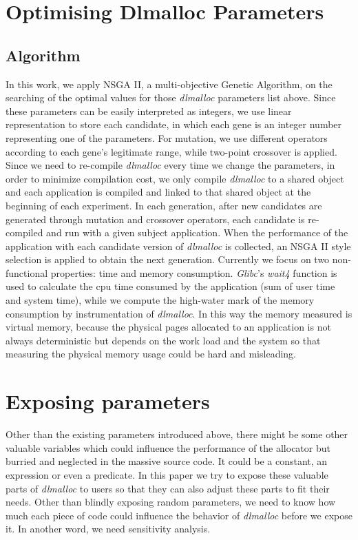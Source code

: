 \section{Optimising Dlmalloc Parameters}

\subsection{Algorithm}
In this work, we apply NSGA II\cite{996017}, a multi-objective Genetic Algorithm, on the searching of the optimal values for those \emph{dlmalloc} parameters list above.
Since these parameters can be easily interpreted as integers, we use linear representation to store each candidate, in which each gene is an integer number representing one of the parameters. For mutation, we use different operators according to each gene's legitimate range, while two-point crossover is applied.
Since we need to re-compile \emph{dlmalloc} every time we change the parameters, in order to minimize compilation cost, we only compile \emph{dlmalloc} to a shared object and each application is compiled and linked to that shared object at the beginning of each experiment. In each generation, after new candidates are generated through mutation and crossover operators, each candidate is re-compiled and run with a given subject application. When the performance of the application with each candidate version of \emph{dlmalloc} is collected, an NSGA II style selection is applied to obtain the next generation.
Currently we focus on two non-functional properties: time and memory consumption. \emph{Glibc}'s \emph{wait4} function is used to calculate the cpu time consumed by the application (sum of user time and system time), while we compute the high-water mark of the memory consumption by instrumentation of \emph{dlmalloc}. In this way the memory measured is virtual memory, because the physical pages allocated to an application is not always deterministic but depends on the work load and the system so that measuring the physical memory usage could be hard and misleading.


\section{Exposing parameters}
Other than the existing parameters introduced above, there might be some other valuable variables which could influence the performance of the allocator but burried and neglected in the massive source code. It could be a constant, an expression or even a predicate. In this paper we try to expose these valuable parts of \emph{dlmalloc} to users so that they can also adjust these parts to fit their needs. Other than blindly exposing random parameters, we need to know how much each piece of code could influence the behavior of \emph{dlmalloc} before we expose it. In another word, we need sensitivity analysis.
